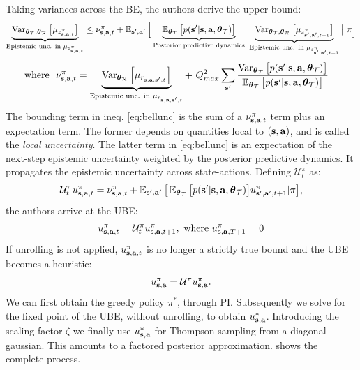\documentclass{article}
\begin{document}
\begin{appendices}
Taking variances across the BE, the authors derive the upper bound:
\begin{align} \label{eq:bellunc}
\underbrace{\operatorname{\text{Var}}_{\boldsymbol{\theta}_{\mathcal{T}}, \boldsymbol{\theta}_{\mathcal{R}}} \big[ \mu_{z^\pi_{\mathbf{s}, \mathbf{a}, t}} \big]}_{\text{Epistemic unc. in $\mu_{z^\pi_{\mathbf{s}, \mathbf{a}, t}}$}} \leq \nu^{\pi}_{\mathbf{s}, \mathbf{a}, t} + \operatorname{\mathbb{E}}_{\mathbf{s}', \mathbf{a}'} \Big[ \underbrace{\operatorname{\mathbb{E}}_{\boldsymbol{\theta}_{\mathcal{T}}} \big[p(\mathbf{s}' | \mathbf{s}, \mathbf{a}, \boldsymbol{\theta}_{\mathcal{T}}) \big] }_{\text{Posterior predictive dynamics}}~\underbrace{\operatorname{\text{Var}}_{\boldsymbol{\theta}_{\mathcal{T}}, \boldsymbol{\theta}_{\mathcal{R}}} \big[ \mu_{z^\pi_{\mathbf{s}', \mathbf{a}', t + 1}} \big]}_{\text{Epistemic unc. in $\mu_{z^\pi_{\mathbf{s}', \mathbf{a}', t + 1}}$}} \big|~\pi \Big]
\end{align}
\begin{align} \label{eq:localunc}
\text{where}~~ \nu^{\pi}_{\mathbf{s}, \mathbf{a}, t} &=  \underbrace{\operatorname{\text{Var}}_{\boldsymbol{\theta}_{\mathcal{R}}} \left[ \mu_{r_{\mathbf{s}, \mathbf{a}, \mathbf{s}', t}} \right]}_{\text{Epistemic unc. in $\mu_{r_{\mathbf{s}, \mathbf{a}, \mathbf{s}', t}}$}} +~Q_{max}^2 \sum_{\mathbf{s}'} \frac{\operatorname{\text{Var}}_{\boldsymbol{\theta}_{\mathcal{T}}} \big[p(\mathbf{s}' | \mathbf{s}, \mathbf{a}, \boldsymbol{\theta}_{\mathcal{T}}) \big]}{\operatorname{\mathbb{E}}_{\boldsymbol{\theta}_{\mathcal{T}}} \big[p(\mathbf{s}' | \mathbf{s}, \mathbf{a}, \boldsymbol{\theta}_{\mathcal{T}}) \big]}
\end{align}
The bounding term in ineq. \ref{eq:bellunc} is the sum of a $\nu^{\pi}_{\mathbf{s}, \mathbf{a}, t}$ term plus an expectation term. The former depends on quantities local to $(\mathbf{s}, \mathbf{a})$, and is called the \textit{local uncertainty}. The latter term in \cref{eq:bellunc} is an expectation of the next-step epistemic uncertainty weighted by the posterior predictive dynamics. It propagates the epistemic uncertainty across state-actions. Defining $\mathcal{U}^\pi_{t}$ as:
\begin{align*}
\mathcal{U}^\pi_t u_{\mathbf{s}, \mathbf{a}, t}^\pi  = \nu^{\pi}_{\mathbf{s}, \mathbf{a}, t} + \operatorname{\mathbb{E}}_{\mathbf{s}', \mathbf{a}'} \big[ \operatorname{\mathbb{E}}_{\boldsymbol{\theta}_{\mathcal{T}}} \big[p(\mathbf{s}' | \mathbf{s}, \mathbf{a}, \boldsymbol{\theta}_{\mathcal{T}})\big] u^\pi_{\mathbf{s}', \mathbf{a}', t + 1} | \pi \big],
\end{align*}
the authors arrive at the UBE:
\begin{gather*}
u_{\mathbf{s}, \mathbf{a}, t}^\pi = \mathcal{U}^\pi_{t} u_{\mathbf{s}, \mathbf{a}, t + 1}^\pi,\text{ where } u_{\mathbf{s}, \mathbf{a}, T + 1}^\pi = 0
\end{gather*}
If unrolling is not applied, $u_{\mathbf{s}, \mathbf{a}, t}^\pi$ is no longer a strictly true bound and the UBE becomes a heuristic:
\begin{align}\label{app:eq:ubenounroll}
u_{\mathbf{s}, \mathbf{a}}^\pi = \mathcal{U}^\pi u_{\mathbf{s}, \mathbf{a}}^\pi.
\end{align}
We can first obtain the greedy policy ${\pi^*}$, through PI. Subsequently we solve for the fixed point of the UBE, without unrolling, to obtain $u_{\mathbf{s}, \mathbf{a}}^*$. Introducing the scaling factor $\zeta$ we finally use $u_{\mathbf{s}, \mathbf{a}}^*$ for Thompson sampling from a diagonal gaussian. This amounts to a factored posterior approximation.  shows the complete process.


\end{appendices}
\end{document}

